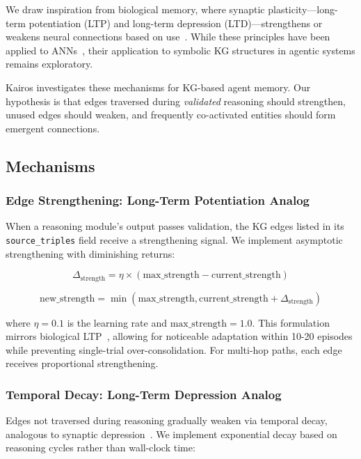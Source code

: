 \documentclass{article}
\begin{document}
We draw inspiration from biological memory, where synaptic plasticity—long-term potentiation (LTP) and long-term depression (LTD)—strengthens or weakens neural connections based on use~\citep{hebb1949organization,squire2015memory}. While these principles have been applied to ANNs~\citep{mvil2024hebbian}, their application to symbolic KG structures in agentic systems remains exploratory.

Kairos investigates these mechanisms for KG-based agent memory. Our hypothesis is that edges traversed during \textit{validated} reasoning should strengthen, unused edges should weaken, and frequently co-activated entities should form emergent connections.

\subsection{Mechanisms}

\subsubsection{Edge Strengthening: Long-Term Potentiation Analog}

When a reasoning module's output passes validation, the KG edges listed in its \texttt{source\_triples} field receive a strengthening signal. We implement asymptotic strengthening with diminishing returns:

\begin{equation}
\Delta_{\text{strength}} = \eta \times (\text{max\_strength} - \text{current\_strength})
\label{eq:ltp}
\end{equation}

\begin{equation}
\text{new\_strength} = \min(\text{max\_strength}, \text{current\_strength} + \Delta_{\text{strength}})
\end{equation}

where $\eta = 0.1$ is the learning rate and $\text{max\_strength} = 1.0$. This formulation mirrors biological LTP~\citep{squire2015memory}, allowing for noticeable adaptation within 10-20 episodes while preventing single-trial over-consolidation. For multi-hop paths, each edge receives proportional strengthening.

\subsubsection{Temporal Decay: Long-Term Depression Analog}

Edges not traversed during reasoning gradually weaken via temporal decay, analogous to synaptic depression~\citep{squire2015memory}. We implement exponential decay based on reasoning cycles rather than wall-clock time:
\end{document}
